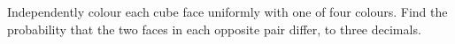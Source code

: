 Independently colour each cube face uniformly with one of four colours. Find the probability that the two faces in each opposite pair differ, to three decimals.
